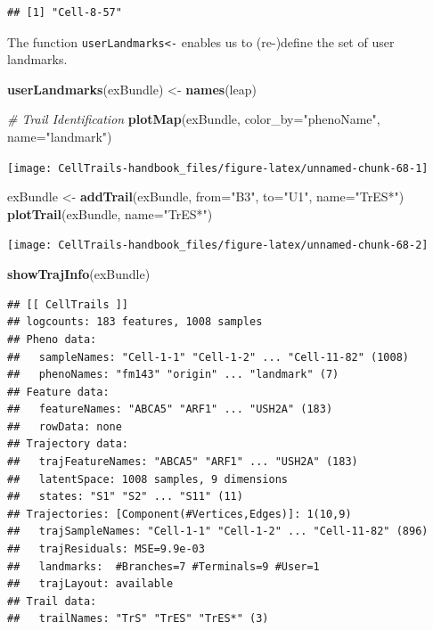 \documentclass[]{book}
\newenvironment{Shaded}{\begin{snugshade}}{\end{snugshade}}
\newcommand{\KeywordTok}[1]{\textcolor[rgb]{0.13,0.29,0.53}{\textbf{#1}}}
\newcommand{\DataTypeTok}[1]{\textcolor[rgb]{0.13,0.29,0.53}{#1}}
\newcommand{\StringTok}[1]{\textcolor[rgb]{0.31,0.60,0.02}{#1}}
\newcommand{\CommentTok}[1]{\textcolor[rgb]{0.56,0.35,0.01}{\textit{#1}}}
\newcommand{\NormalTok}[1]{#1}
\theoremstyle{definition}
\theoremstyle{definition}
\theoremstyle{definition}
\theoremstyle{remark}
\begin{document}
\begin{verbatim}
## [1] "Cell-8-57"
\end{verbatim}

The function \texttt{userLandmarks\textless{}-} enables us to
(re-)define the set of user landmarks.

\begin{Shaded}
\begin{Highlighting}[]
\KeywordTok{userLandmarks}\NormalTok{(exBundle) <-}\StringTok{ }\KeywordTok{names}\NormalTok{(leap)}

\CommentTok{# Trail Identification}
\KeywordTok{plotMap}\NormalTok{(exBundle, }\DataTypeTok{color_by=}\StringTok{"phenoName"}\NormalTok{, }\DataTypeTok{name=}\StringTok{"landmark"}\NormalTok{)}
\end{Highlighting}
\end{Shaded}

\texttt{[image: CellTrails-handbook\_files/figure-latex/unnamed-chunk-68-1]}

\begin{Shaded}
\begin{Highlighting}[]
\NormalTok{exBundle <-}\StringTok{ }\KeywordTok{addTrail}\NormalTok{(exBundle, }\DataTypeTok{from=}\StringTok{"B3"}\NormalTok{, }\DataTypeTok{to=}\StringTok{"U1"}\NormalTok{, }\DataTypeTok{name=}\StringTok{"TrES*"}\NormalTok{)}
\KeywordTok{plotTrail}\NormalTok{(exBundle, }\DataTypeTok{name=}\StringTok{"TrES*"}\NormalTok{)}
\end{Highlighting}
\end{Shaded}

\texttt{[image: CellTrails-handbook\_files/figure-latex/unnamed-chunk-68-2]}

\begin{Shaded}
\begin{Highlighting}[]
\KeywordTok{showTrajInfo}\NormalTok{(exBundle)}
\end{Highlighting}
\end{Shaded}

\begin{verbatim}
## [[ CellTrails ]] 
## logcounts: 183 features, 1008 samples
## Pheno data: 
##   sampleNames: "Cell-1-1" "Cell-1-2" ... "Cell-11-82" (1008)
##   phenoNames: "fm143" "origin" ... "landmark" (7)
## Feature data: 
##   featureNames: "ABCA5" "ARF1" ... "USH2A" (183)
##   rowData: none
## Trajectory data: 
##   trajFeatureNames: "ABCA5" "ARF1" ... "USH2A" (183)
##   latentSpace: 1008 samples, 9 dimensions
##   states: "S1" "S2" ... "S11" (11)
## Trajectories: [Component(#Vertices,Edges)]: 1(10,9)
##   trajSampleNames: "Cell-1-1" "Cell-1-2" ... "Cell-11-82" (896)
##   trajResiduals: MSE=9.9e-03
##   landmarks:  #Branches=7 #Terminals=9 #User=1
##   trajLayout: available
## Trail data: 
##   trailNames: "TrS" "TrES" "TrES*" (3)
\end{verbatim}
\end{document}
